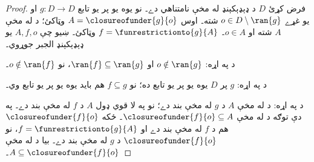 \documentclass[../../../include/open-logic-section]{subfiles}
\begin{document}
\begin{proof}
فرض کړئ $D$ د ډېډېکېنډ له مخې نامتناهي دے۔ نو يوه يو پر يو تابع
$g \colon D \to D$ او يو غړے $o \in D \setminus \ran{g}$ شته۔
اوس $A = \closureofunder{g}{o}$ وټاکئ؛ د
 له مخې $A$ شته او $o \in A$۔
$f = \funrestrictionto{g}{A}$ وټاکئ۔ ښيو چې $A, f, o$ يو
ډېډېکېنډ الجبر جوړوي۔

د  په اړه: $o \notin \ran{g}$ او $\ran{f}
\subseteq \ran{g}$، نو $o\notin \ran{f}$۔

د  په اړه: $g$ پر $D$ يوه يو پر يو تابع ده؛
نو $f \subseteq g$ هم بايد يوه يو پر يو تابع وي۔

د  په اړه: د  له مخې
$A$ د $g$ له مخې بند دے؛ نو په لا قوي ډول $A$ د $f$ له مخې بند
دے۔ په دې توګه د  له مخې
$\closureofunder{f}{o} \subseteq A$۔ ځکه $\closureofunder{f}{o}$
هم د $f$ له مخې بند دے او $f = \funrestrictionto{g}{A}$، نو
$\closureofunder{f}{o}$ د $g$ له مخې بند دے۔ بيا د
 له مخې
$A \subseteq \closureofunder{f}{o}$۔
\end{proof}
\end{document}
